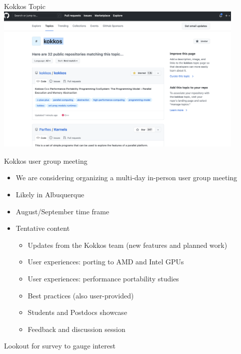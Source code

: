 \begin{frame}[fragile]{Kokkos Topic}
  \includegraphics[width=0.9\textwidth]{3_7/kokkos-topic.png}
\end{frame}

\begin{frame}[fragile]{Kokkos user group meeting}
\begin{itemize}
\item We are considering organizing a multi-day in-person user group meeting 
\item Likely in Albuquerque
\item August/September time frame
\item Tentative content
   \begin{itemize}
   \item Updates from the Kokkos team (new features and planned work)
   \item User experiences: porting to AMD and Intel GPUs
   \item User experiences: performance portability studies
   \item Best practices (also user-provided)
   \item Students and Postdocs showcase
   \item Feedback and discussion session
   \end{itemize}
\end{itemize}
\vspace{10pt}
Lookout for survey to gauge interest
\end{frame}














